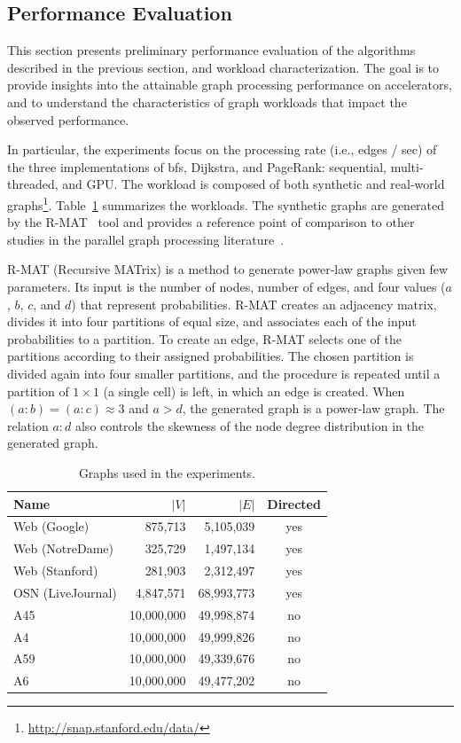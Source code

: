 \subsection{Performance Evaluation}
\label{sec:evaluation}

This section presents preliminary performance evaluation of the algorithms described in the previous section, and workload characterization. The goal is to provide insights into the attainable graph processing performance on accelerators, and to understand the characteristics of graph workloads that impact the observed performance. 

In particular, the experiments focus on the processing rate (i.e., edges / sec) of the three implementations of {\sc bfs}, Dijkstra, and PageRank: sequential, multi-threaded, and GPU. The workload is composed of both synthetic and real-world graphs\footnote{\url{http://snap.stanford.edu/data/}}. Table~\ref{tab:workload} summarizes the workloads. The synthetic graphs are generated by the R-MAT~\cite{rmat} tool and provides a reference point of comparison to other studies in the parallel graph processing literature~\cite{agarwal2010scalable}.

R-MAT (Recursive MATrix) \cite{rmat} is a method to generate power-law graphs given few parameters. Its input is the number of nodes, number of edges, and four values ($a$, $b$, $c$, and $d$) that represent probabilities. R-MAT creates an adjacency matrix, divides it into four partitions of equal size, and associates each of the input probabilities to a partition. To create an edge, R-MAT selects one of the partitions according to their assigned probabilities. The chosen partition is divided again into four smaller partitions, and the procedure is repeated until a partition of $1 \times 1$ (a single cell) is left, in which an edge is created. When $(a : b) = (a : c) \approx 3$ and $a > d$, the generated graph is a power-law graph. The relation $a : d$ also controls the skewness of the node degree distribution in the generated graph.

\begin{table}[ht]
\centering
\begin{tabular}{l|r|r|c}
Name              & $|V|$   & $|E|$      & Directed \\\hline
Web (Google)      & 875,713 & 5,105,039  & yes      \\\hline
Web (NotreDame)   & 325,729 & 1,497,134  & yes      \\\hline
Web (Stanford)    & 281,903 & 2,312,497  & yes      \\\hline
OSN (LiveJournal) & 4,847,571 & 68,993,773 & yes    \\\hline
A45         & 10,000,000 & 49,998,874 & no \\\hline
A4          & 10,000,000 & 49,999,826 & no \\\hline
A59         & 10,000,000 & 49,339,676 & no \\\hline
A6          & 10,000,000 & 49,477,202 & no \\\hline
\end{tabular}
\caption{Graphs used in the experiments.}
\label{tab:workload}
\end{table}

